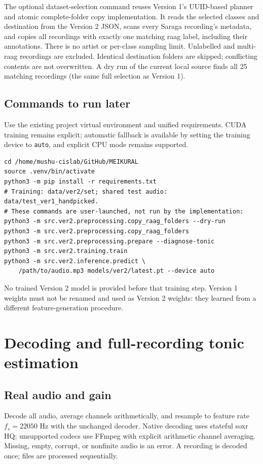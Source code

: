 \documentclass[11pt,a4paper]{article}
\begin{document}
The optional dataset-selection command reuses Version 1's UUID-based planner and
atomic complete-folder copy implementation. It reads the selected classes and
destination from the Version 2 JSON, scans every Saraga recording's metadata,
and copies all recordings with exactly one matching raag label, including their
annotations. There is no artist or per-class sampling limit. Unlabelled and
multi-raag recordings are excluded. Identical destination folders are skipped;
conflicting contents are not overwritten. A dry run of the current local source
finds all 25 matching recordings (the same full selection as Version 1).

\subsection{Commands to run later}
Use the existing project virtual environment and unified requirements. CUDA
training remains explicit; automatic fallback is available by setting the training
device to \texttt{auto}, and explicit CPU mode remains supported.
\begin{lstlisting}
cd /home/mushu-cislab/GitHub/MEIKURAL
source .venv/bin/activate
python3 -m pip install -r requirements.txt
# Training: data/ver2/set; shared test audio: data/test_ver1_handpicked.
# These commands are user-launched, not run by the implementation:
python3 -m src.ver2.preprocessing.copy_raag_folders --dry-run
python3 -m src.ver2.preprocessing.copy_raag_folders
python3 -m src.ver2.preprocessing.prepare --diagnose-tonic
python3 -m src.ver2.training.train
python3 -m src.ver2.inference.predict \
    /path/to/audio.mp3 models/ver2/latest.pt --device auto
\end{lstlisting}
No trained Version 2 model is provided before that training step. Version 1
weights must not be renamed and used as Version 2 weights: they learned from a
different feature-generation procedure.

\section{Decoding and full-recording tonic estimation}
\subsection{Real audio and gain}
Decode all audio, average channels arithmetically, and resample to feature rate
$f_s=22050$ Hz with the unchanged decoder. Native decoding uses stateful soxr HQ;
unsupported codecs use FFmpeg with explicit arithmetic channel averaging.
Missing, empty, corrupt, or nonfinite audio is an error. A recording is decoded
once; files are processed sequentially.
\end{document}
